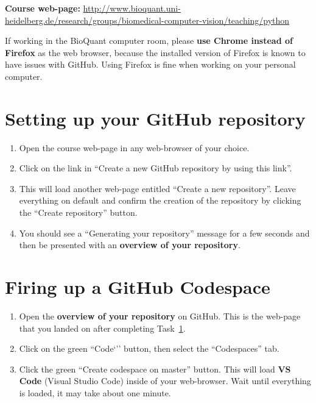 \documentclass[12pt,a4paper]{article}
\begin{document}

\textbf{Course web-page:} \url{http://www.bioquant.uni-heidelberg.de/research/groups/biomedical-computer-vision/teaching/python}

\vspace{0.5em}
If working in the BioQuant computer room, please \textbf{use Chrome instead of Firefox} as the web browser, because the installed version of Firefox is known to have issues with GitHub. Using Firefox is fine when working on your personal computer.

\section{Setting up your GitHub repository}
\label{task:preparation}
\begin{enumerate}
\item Open the course web-page in any web-browser of your choice.
\item Click on the link in ``Create a new GitHub repository by using this link''.
\item This will load another web-page entitled ``Create a new repository''. Leave everything on default and confirm the creation of the repository by clicking the ``Create repository'' button.
\item You should see a ``Generating your repository'' message for a few seconds and then be presented with an \textbf{overview of your repository}.
\end{enumerate}

\section{Firing up a GitHub Codespace}
\label{task:codespaces}
\begin{enumerate}
\item Open the \textbf{overview of your repository} on GitHub. This is the web-page that you landed on after completing Task~\ref{task:preparation}.
\item Click on the green ``Code`'' button, then select the ``Codespaces'' tab.
\item Click the green ``Create codespace on master'' button. This will load \textbf{VS Code} (Visual Studio Code) inside of your web-browser. Wait until everything is loaded, it may take about one minute.
\end{enumerate}
\end{document}
